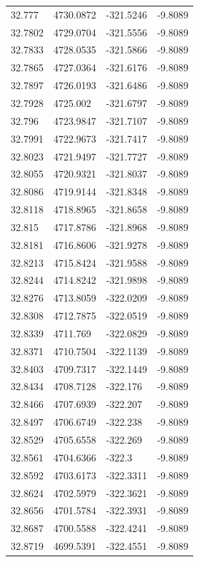 \begin{table}[H]
\begin{tabular}{llll}
32.777 & 4730.0872 & -321.5246 & -9.8089 \\
32.7802 & 4729.0704 & -321.5556 & -9.8089 \\
32.7833 & 4728.0535 & -321.5866 & -9.8089 \\
32.7865 & 4727.0364 & -321.6176 & -9.8089 \\
32.7897 & 4726.0193 & -321.6486 & -9.8089 \\
32.7928 & 4725.002 & -321.6797 & -9.8089 \\
32.796 & 4723.9847 & -321.7107 & -9.8089 \\
32.7991 & 4722.9673 & -321.7417 & -9.8089 \\
32.8023 & 4721.9497 & -321.7727 & -9.8089 \\
32.8055 & 4720.9321 & -321.8037 & -9.8089 \\
32.8086 & 4719.9144 & -321.8348 & -9.8089 \\
32.8118 & 4718.8965 & -321.8658 & -9.8089 \\
32.815 & 4717.8786 & -321.8968 & -9.8089 \\
32.8181 & 4716.8606 & -321.9278 & -9.8089 \\
32.8213 & 4715.8424 & -321.9588 & -9.8089 \\
32.8244 & 4714.8242 & -321.9898 & -9.8089 \\
32.8276 & 4713.8059 & -322.0209 & -9.8089 \\
32.8308 & 4712.7875 & -322.0519 & -9.8089 \\
32.8339 & 4711.769 & -322.0829 & -9.8089 \\
32.8371 & 4710.7504 & -322.1139 & -9.8089 \\
32.8403 & 4709.7317 & -322.1449 & -9.8089 \\
32.8434 & 4708.7128 & -322.176 & -9.8089 \\
32.8466 & 4707.6939 & -322.207 & -9.8089 \\
32.8497 & 4706.6749 & -322.238 & -9.8089 \\
32.8529 & 4705.6558 & -322.269 & -9.8089 \\
32.8561 & 4704.6366 & -322.3 & -9.8089 \\
32.8592 & 4703.6173 & -322.3311 & -9.8089 \\
32.8624 & 4702.5979 & -322.3621 & -9.8089 \\
32.8656 & 4701.5784 & -322.3931 & -9.8089 \\
32.8687 & 4700.5588 & -322.4241 & -9.8089 \\
32.8719 & 4699.5391 & -322.4551 & -9.8089 \\

\end{tabular}
\end{table}
